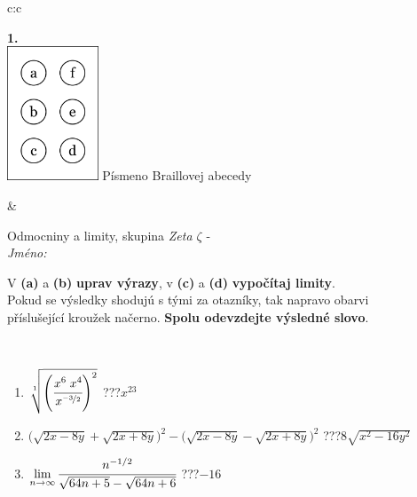 \documentclass[10pt]{report}
\begin{document}
\begin{tabular}{c:c}
\begin{minipage}[c][104.5mm][t]{0.5\linewidth}
\begin{center}
\begin{minipage}{0.20\linewidth}
\begin{center}
{\Huge\bfseries 1.} \\[2mm]
\includegraphics[height=40mm]{../images/braille.png}
{\small Písmeno Braillovej abecedy}
\end{center}
\end{minipage}
\end{center}
\end{minipage}
&
\begin{minipage}[c][104.5mm][t]{0.5\linewidth}
\begin{center}
\vspace{7mm}
{\huge Odmocniny a limity, skupina \textit{Zeta $\zeta$} -}\\[5mm]
\textit{Jméno:}\phantom{xxxxxxxxxxxxxxxxxxxxxxxxxxxxxxxxxxxxxxxxxxxxxxxxxxxxxxxxxxxxxxxxx}\\[5mm]
\begin{minipage}{0.95\linewidth}
\begin{center}
V \textbf{(a)} a \textbf{(b)} \textbf{uprav výrazy}, v \textbf{(c)} a \textbf{(d)} \textbf{vypočítaj limity}.\\Pokud se výsledky shodujú s tými za otazníky, tak napravo obarvi\\příslušející kroužek načerno. \textbf{Spolu odevzdejte výsledné slovo}.
\end{center}
\end{minipage}
\\[1mm]
\begin{minipage}{0.79\linewidth}
\begin{center}
\begin{varwidth}{\linewidth}
\begin{enumerate}
\small
\item $\sqrt[1]{\left(\cfrac{x^{6}\;x^{4}}{x^{\nicefrac{-3}{2}}}\right)^{2}}$\quad \dotfill\; ???\;\dotfill \quad $x^{23}$
\item {\footnotesize{\scriptsize$\big(\sqrt{2x-8y}+\sqrt{2x+8y}\big)^2-\big(\sqrt{2x-8y}-\sqrt{2x+8y}\big)^2$}\quad \dotfill\; ???\;\dotfill \quad $8\sqrt{x^2-16y^2}$}
\item $\lim\limits_{n\to\infty}\cfrac{n^{-1/2}}{\sqrt{64n+5}-\sqrt{64n+6}}$\quad \dotfill\; ???\;\dotfill \quad $-16$

\end{enumerate}
\end{varwidth}
\end{center}
\end{minipage}
\end{center}
\end{minipage}
\end{tabular}
\end{document}
